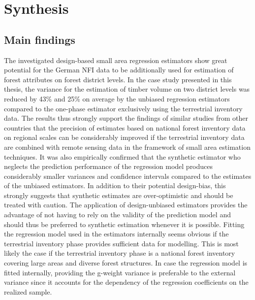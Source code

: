 	
\chapter{Synthesis}
\label{chap:synth}
\newpage



\section{Main findings}
\label{sec:synth:mainfind}

The investigated design-based small area regression estimators show great potential for the German NFI data to be additionally used for estimation of forest attributes on forest district levels. In the case study presented in this thesis, the variance for the estimation of timber volume on two district levels was reduced by 43\% and 25\% on average by the unbiased regression estimators compared to the one-phase estimator exclusively using the terrestrial inventory data. The results thus strongly support the findings of similar studies from other countries that the precision of estimates based on national forest inventory data on regional scales can be considerably improved if the terrestrial inventory data are combined with remote sensing data in the framework of small area estimation techniques. It was also empirically confirmed that the synthetic estimator who neglects the prediction performance of the regression model produces considerably smaller variances and confidence intervals compared to the estimates of the unbiased estimators. In addition to their potential design-bias, this strongly suggests that synthetic estimates are over-optimistic and should be treated with caution. The application of design-unbiased estimators provides the advantage of not having to rely on the validity of the prediction model and should thus be preferred to synthetic estimation whenever it is possible. Fitting the regression model used in the estimators internally seems obvious if the terrestrial inventory phase provides sufficient data for modelling. This is most likely the case if the terrestrial inventory phase is a national forest inventory covering large areas and diverse forest structures. In case the regression model is fitted internally, providing the g-weight variance is preferable to the external variance since it accounts for the dependency of the regression coefficients on the realized sample.\par

